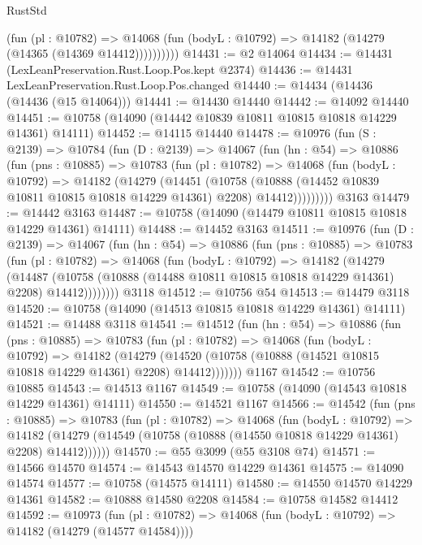 \begin{lexlean}{RustStd}
\begin{coremodule}
              (fun (pl : @10782) =>
              @14068 (fun (bodyL : @10792) => @14182 (@14279 (@14365 (@14369 @14412))))))))))
@14431 := @2 @14064
@14434 := @14431 (LexLeanPreservation.Rust.Loop.Pos.kept @2374)
@14436 := @14431 LexLeanPreservation.Rust.Loop.Pos.changed
@14440 := @14434 (@14436 (@14436 (@15 @14064)))
@14441 := @14430 @14440
@14442 := @14092 @14440
@14451 := @10758 (@14090 (@14442 @10839 @10811 @10815 @10818 @14229 @14361) @14111)
@14452 := @14115 @14440
@14478 := @10976
    (fun (S : @2139) =>
    @10784
      (fun (D : @2139) =>
      @14067
        (fun (hn : @54) =>
        @10886
          (fun (pns : @10885) =>
          @10783
            (fun (pl : @10782) =>
            @14068
              (fun (bodyL : @10792) =>
              @14182
                (@14279
                  (@14451
                    (@10758
                      (@10888 (@14452 @10839 @10811 @10815 @10818 @14229 @14361) @2208)
                      @14412)))))))))
    @3163
@14479 := @14442 @3163
@14487 := @10758 (@14090 (@14479 @10811 @10815 @10818 @14229 @14361) @14111)
@14488 := @14452 @3163
@14511 := @10976
    (fun (D : @2139) =>
    @14067
      (fun (hn : @54) =>
      @10886
        (fun (pns : @10885) =>
        @10783
          (fun (pl : @10782) =>
          @14068
            (fun (bodyL : @10792) =>
            @14182
              (@14279
                (@14487
                  (@10758 (@10888 (@14488 @10811 @10815 @10818 @14229 @14361) @2208) @14412))))))))
    @3118
@14512 := @10756 @54
@14513 := @14479 @3118
@14520 := @10758 (@14090 (@14513 @10815 @10818 @14229 @14361) @14111)
@14521 := @14488 @3118
@14541 := @14512
    (fun (hn : @54) =>
    @10886
      (fun (pns : @10885) =>
      @10783
        (fun (pl : @10782) =>
        @14068
          (fun (bodyL : @10792) =>
          @14182
            (@14279
              (@14520 (@10758 (@10888 (@14521 @10815 @10818 @14229 @14361) @2208) @14412)))))))
    @1167
@14542 := @10756 @10885
@14543 := @14513 @1167
@14549 := @10758 (@14090 (@14543 @10818 @14229 @14361) @14111)
@14550 := @14521 @1167
@14566 := @14542
    (fun (pns : @10885) =>
    @10783
      (fun (pl : @10782) =>
      @14068
        (fun (bodyL : @10792) =>
        @14182 (@14279 (@14549 (@10758 (@10888 (@14550 @10818 @14229 @14361) @2208) @14412))))))
@14570 := @55 @3099 (@55 @3108 @74)
@14571 := @14566 @14570
@14574 := @14543 @14570 @14229 @14361
@14575 := @14090 @14574
@14577 := @10758 (@14575 @14111)
@14580 := @14550 @14570 @14229 @14361
@14582 := @10888 @14580 @2208
@14584 := @10758 @14582 @14412
@14592 := @10973
    (fun (pl : @10782) => @14068 (fun (bodyL : @10792) => @14182 (@14279 (@14577 @14584))))

\end{coremodule}
\end{lexlean}
